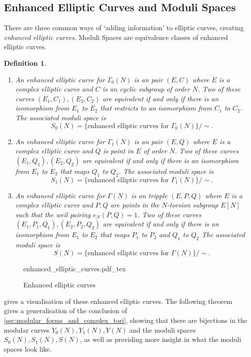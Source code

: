 \documentclass[a4paper]{article}
\newcommand{\incfig}[1]{%
	\def\svgwidth{\columnwidth}
	{#1.pdf_tex}
}
\theoremstyle{theoremdd}
\theoremstyle{definitiondd}
\newtheorem{definition}[theorem]{Definition}
\theoremstyle{remarkdd}
\begin{document}
\subsection{Enhanced Elliptic Curves and Moduli Spaces} \label{sec:enhanced_elliptic_curves_and_moduli_spaces}
There are three common ways of `adding information' to elliptic curves, creating \emph{enhanced elliptic curves}. Moduli Spaces are equivalence classes of enhanced elliptic curves.  
\begin{definition} \hspace{\linewidth}
	\begin{enumerate}
		\item An \emph{enhanced elliptic curve for $\Gamma_0(N)$} is an pair $(E, C)$ where  $E$ is a complex elliptic curve and $C$ is an cyclic subgroup of order $N$.
		Two of these curves $(E_1, C_1), (E_2, C_2)$ are equivalent if and only if there is an isomorphism from $E_1$ to $E_2$ that restricts to an isomorphism from $C_1$ to $C_2$.
		The associated \emph{moduli space} is \[
			S_0(N) = \{ \text{enhanced elliptic curves for } \Gamma_0(N)\} / \sim
		.\] 
	\item An \emph{enhanced elliptic curve for $\Gamma_1(N)$} is an pair $(E, Q)$ where  $E$ is a complex elliptic curve and $Q$ is point in $E$ of order $N$.
		Two of these curves $(E_1, Q_1), (E_2, Q_2)$ are equivalent if and only if there is an isomorphism from $E_1$ to $E_2$ that maps $Q_1$ to $Q_2$.
		The associated \emph{moduli space} is \[
			S_1(N) = \{ \text{enhanced elliptic curves for } \Gamma_1(N)\} / \sim
		.\] 
	\item An \emph{enhanced elliptic curve for $\Gamma(N)$} is an tripple $(E, P, Q)$ where  $E$ is a complex elliptic curve and $P, Q$ are points in the $N$-torsion subgroup $E[N]$ such  that the weil pairing  $e_N(P, Q) = 1$.
		Two of these curves $(E_1, P_1, Q_1), (E_2, P_2, Q_2)$ are equivalent if and only if there is an isomorphism from $E_1$ to $E_2$ that maps $P_1$ to $P_2$ and $Q_1$ to $Q_2$
		The associated \emph{moduli space} is \[
			S(N) = \{ \text{enhanced elliptic curves for } \Gamma(N)\} / \sim
		.\] 
	\end{enumerate}	
\end{definition}
\begin{figure}[h]
	\centering
	\incfig{enhanced_elliptic_curves}
	\caption{Enhanced elliptic curves}
	\label{fig:enhanced_elliptic_curves}
\end{figure}
 gives a visualisation of these enhanced elliptic curves.
The following theorem gives a generalisation of the conclusion of \cref{sec:modular_forms_and_complex_tori}, showing that there are bijections in the modular curves $Y_0(N), Y_1(N), Y(N)$ and the moduli spaces $S_0(N), S_1(N), S(N)$, as well as providing more insight in what the moduli spaces look like. 
\end{document}
